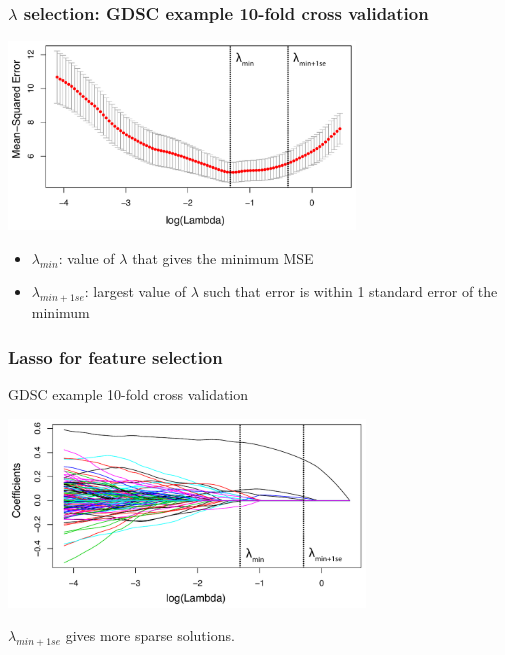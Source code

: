 \documentclass[notes]{beamer}          %
\begin{document}
\begin{frame}
\frametitle{$\lambda$ selection: GDSC example 10-fold cross validation}

\begin{center}
\includegraphics[height=5cm]{../figures/week_2_linear_models/Lasso_MSE_crossvalidation.pdf}
\end{center}

\vspace{-2mm} 

\begin{itemize}
    \item $\lambda_{min}$: value of $\lambda$ that gives the minimum MSE
    \item $\lambda_{min+1se}$: largest value of $\lambda$ such that error is within 1 standard error of the minimum
\end{itemize}

\end{frame}

\begin{frame}
\frametitle{Lasso for feature selection}
GDSC example 10-fold cross validation

\begin{center}
\includegraphics[height=5cm]{../figures/week_2_linear_models/Lasso_feature_selection.pdf}
\end{center}

$\lambda_{min+1se}$ gives more sparse solutions.

\end{frame}
\end{document}
